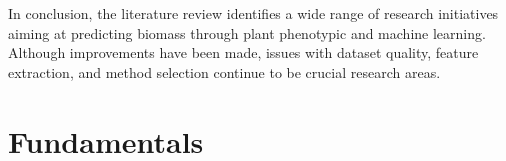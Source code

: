 \documentclass[a4paper,12pt]{report}%
\renewcommand{\\}{\vspace*{0.5\baselineskip} \newline}
\begin{document}
\noindent In conclusion, the literature review identifies a wide range of research initiatives aiming at predicting biomass through plant phenotypic and machine learning. Although improvements have been made, issues with dataset quality, feature extraction, and method selection continue to be crucial research areas.




\chapter{Fundamentals}

\end{document}
